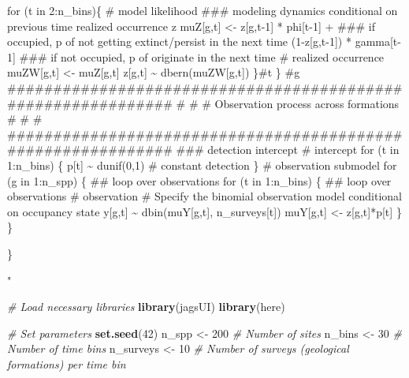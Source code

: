 \documentclass[
]{article}
\newenvironment{Shaded}{\begin{snugshade}}{\end{snugshade}}
\newcommand{\CommentTok}[1]{\textcolor[rgb]{0.56,0.35,0.01}{\textit{#1}}}
\newcommand{\DecValTok}[1]{\textcolor[rgb]{0.00,0.00,0.81}{#1}}
\newcommand{\FunctionTok}[1]{\textcolor[rgb]{0.13,0.29,0.53}{\textbf{#1}}}
\newcommand{\NormalTok}[1]{#1}
\newcommand{\OtherTok}[1]{\textcolor[rgb]{0.56,0.35,0.01}{#1}}
\newcommand{\StringTok}[1]{\textcolor[rgb]{0.31,0.60,0.02}{#1}}
\begin{document}
{\begin{Shaded}
\begin{Highlighting}[]
\StringTok{      }
\StringTok{                for (t in 2:n\_bins)\{}
\StringTok{              }
\StringTok{                  \# model likelihood}
\StringTok{                  \#\#\# modeling dynamics conditional on previous time realized occurrence z}
\StringTok{                  muZ[g,t] \textless{}{-} z[g,t{-}1] *  phi[t{-}1] + \#\#\# if occupied, p of not getting extinct/persist in the next time}
\StringTok{                                (1{-}z[g,t{-}1]) *  gamma[t{-}1] \#\#\#  if not occupied, p of originate in the next time}
\StringTok{                  }
\StringTok{                 \# realized occurrence}
\StringTok{                 muZW[g,t] \textless{}{-} muZ[g,t]}
\StringTok{                   z[g,t] \textasciitilde{} dbern(muZW[g,t])}
\StringTok{              }
\StringTok{          \}\#t}
\StringTok{        }
\StringTok{        \} \#g}
\StringTok{  }
\StringTok{  }
\StringTok{    \#\#\#\#\#\#\#\#\#\#\#\#\#\#\#\#\#\#\#\#\#\#\#\#\#\#\#\#\#\#\#\#\#\#\#\#\#\#\#\#\#\#\#\#\#\#\#\#\#\#\#\#\#\#\#\#\#\#\#\#\#}
\StringTok{    \#                                                           \#}
\StringTok{    \#         Observation process across formations             \#}
\StringTok{    \#                                                           \#}
\StringTok{    \#\#\#\#\#\#\#\#\#\#\#\#\#\#\#\#\#\#\#\#\#\#\#\#\#\#\#\#\#\#\#\#\#\#\#\#\#\#\#\#\#\#\#\#\#\#\#\#\#\#\#\#\#\#\#\#\#\#\#\#\#}
\StringTok{    }
\StringTok{    \#\#\#  detection intercept}
\StringTok{    \# intercept    }
\StringTok{    for (t in 1:n\_bins) \{}
\StringTok{      p[t] \textasciitilde{} dunif(0,1) \# constant detection}
\StringTok{    \}}
\StringTok{    }
\StringTok{    \# observation submodel}
\StringTok{    for (g in 1:n\_spp) \{ \#\# loop over observations }
\StringTok{      }
\StringTok{      for (t in 1:n\_bins) \{ \#\# loop over observations }
\StringTok{    }
\StringTok{          \# observation}
\StringTok{          \# Specify the binomial observation model conditional on occupancy state}
\StringTok{          y[g,t] \textasciitilde{} dbin(muY[g,t], n\_surveys[t])}
\StringTok{          muY[g,t] \textless{}{-} z[g,t]*p[t]}
\StringTok{                  }
\StringTok{        \}}
\StringTok{      }
\StringTok{    \}}
\StringTok{      }

\StringTok{\}}

\StringTok{"}

\CommentTok{\# Load necessary libraries}
\FunctionTok{library}\NormalTok{(jagsUI)}
\FunctionTok{library}\NormalTok{(here)}

\CommentTok{\# Set parameters}
\FunctionTok{set.seed}\NormalTok{(}\DecValTok{42}\NormalTok{)}
\NormalTok{n\_spp }\OtherTok{\textless{}{-}} \DecValTok{200}  \CommentTok{\# Number of sites}
\NormalTok{n\_bins }\OtherTok{\textless{}{-}} \DecValTok{30}   \CommentTok{\# Number of time bins}
\NormalTok{n\_surveys }\OtherTok{\textless{}{-}} \DecValTok{10}  \CommentTok{\# Number of surveys (geological formations) per time bin}


\end{Highlighting}
\end{Shaded}}
\end{document}
